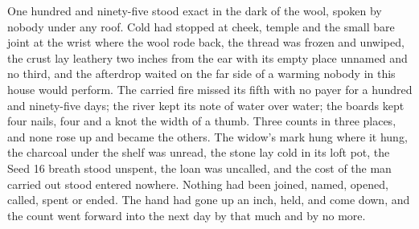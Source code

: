 One hundred and ninety-five stood exact in the dark of the wool, spoken by nobody under any roof. Cold had stopped at cheek, temple and the small bare joint at the wrist where the wool rode back, the thread was frozen and unwiped, the crust lay leathery two inches from the ear with its empty place unnamed and no third, and the afterdrop waited on the far side of a warming nobody in this house would perform. The carried fire missed its fifth with no payer for a hundred and ninety-five days; the river kept its note of water over water; the boards kept four nails, four and a knot the width of a thumb. Three counts in three places, and none rose up and became the others. The widow's mark hung where it hung, the charcoal under the shelf was unread, the stone lay cold in its loft pot, the Seed 16 breath stood unspent, the loan was uncalled, and the cost of the man carried out stood entered nowhere. Nothing had been joined, named, opened, called, spent or ended. The hand had gone up an inch, held, and come down, and the count went forward into the next day by that much and by no more.
